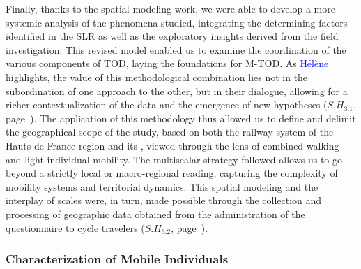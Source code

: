 \begin{refsegment}
Finally, thanks to the spatial modeling work, we were able to develop a more systemic analysis of the phenomena studied, integrating the determining factors identified in the \acrfull{SLR} as well as the exploratory insights derived from the field investigation. This revised model enabled us to examine the coordination of the various components of \acrshort{TOD}, laying the foundations for \acrshort{M-TOD}. As \textcolor{blue}{Hélène} \textcolor{blue}{\textcite{nessi_traduire_2022}} highlights, the value of this methodological combination lies not in the subordination of one approach to the other, but in their dialogue, allowing for a richer contextualization of the data and the emergence of new hypotheses (\hyperref[sous-hypothese-3.1]{\(S.H_{3.1}\)}, page~\pageref{sous-hypothese-3.1}). The application of this methodology thus allowed us to define and delimit the geographical scope of the study, based on both the railway system of the Hauts-de-France region and its , viewed through the lens of combined walking and light individual mobility. The multiscalar strategy followed allows us to go beyond a strictly local or macro-regional reading, capturing the complexity of mobility systems and territorial dynamics. This spatial modeling and the interplay of scales were, in turn, made possible through the collection and processing of geographic data obtained from the administration of the questionnaire to cycle travelers (\hyperref[sous-hypothese-3.2]{\(S.H_{3.2}\)}, page~\pageref{sous-hypothese-3.2}).%

\subsubsection*{Characterization of Mobile Individuals
    \label{conclusion-generale:principaux-apports-chapitre4}
    }


\end{refsegment}

